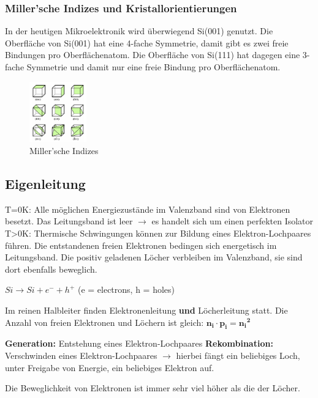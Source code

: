 		
	\subsubsection{Miller'sche Indizes und Kristallorientierungen}
	
		In der heutigen Mikroelektronik wird überwiegend Si(001) genutzt.
		Die Oberfläche von Si(001) hat eine 4-fache Symmetrie, damit gibt es zwei freie Bindungen pro Oberflächenatom.
		Die Oberfläche von Si(111) hat dagegen eine 3-fache Symmetrie und damit nur eine freie Bindung pro Oberflächenatom.
		
		\begin{figure}[h]
			\centering
			\includegraphics[width=0.22\textwidth]{Kapitel/Kap02/millerscheIndizes.PNG}
			\caption{Miller'sche Indizes}
			\label{02_millInd}
		\end{figure}
	
\subsection{Eigenleitung}
	T=0K: Alle möglichen Energiezustände im Valenzband sind von Elektronen besetzt. Das Leitungsband ist leer $\rightarrow$ es handelt sich um einen perfekten Isolator
	T>0K: Thermische Schwingungen können zur Bildung eines Elektron-Lochpaares führen. Die entstandenen freien Elektronen bedingen sich energetisch im Leitungsband. Die positiv geladenen Löcher verbleiben im Valenzband, sie sind dort ebenfalls beweglich.
	
	$Si \longrightarrow Si + e^- + h^+$ (e = electrons, h = holes)
	
	Im reinen Halbleiter finden Elektronenleitung \textbf{und} Löcherleitung statt. Die Anzahl von freien Elektronen und Löchern ist gleich: $\mathbf{n_i \cdot{p_i} = {n_i}^2}$
	
	\textbf{Generation:} Entstehung eines Elektron-Lochpaares
	\textbf{Rekombination:} Verschwinden eines Elektron-Lochpaares
	$\rightarrow$ hierbei fängt ein beliebiges Loch, unter Freigabe von Energie, ein beliebiges Elektron auf.
	
	Die Beweglichkeit von Elektronen ist immer sehr viel höher als die der Löcher.
	

